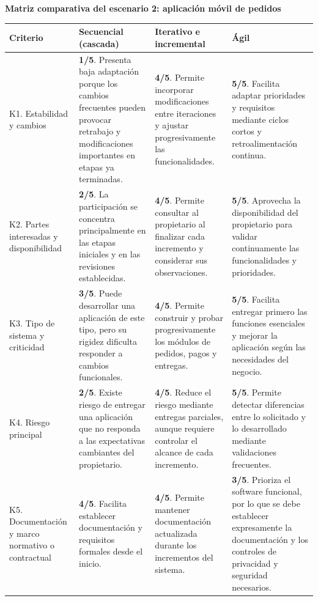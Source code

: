 \documentclass[11pt,a4paper]{article}
\begin{document}
	\noindent\begin{minipage}{\textwidth}
	\begin{center}
		\textbf{Matriz comparativa del escenario 2: aplicación móvil de pedidos}
	\end{center}
	
	\begin{tabularx}{\textwidth}{|p{2.6cm}|Y|Y|Y|}
		\hline
		\textbf{Criterio} &
		\textbf{Secuencial (cascada)} &
		\textbf{Iterativo e incremental} &
		\textbf{Ágil} \\ \hline
		
		K1. Estabilidad y cambios &
		\textbf{1/5}. Presenta baja adaptación porque los cambios frecuentes pueden provocar retrabajo y modificaciones importantes en etapas ya terminadas. &
		\textbf{4/5}. Permite incorporar modificaciones entre iteraciones y ajustar progresivamente las funcionalidades. &
		\textbf{5/5}. Facilita adaptar prioridades y requisitos mediante ciclos cortos y retroalimentación continua. \\ \hline
		
		K2. Partes interesadas y disponibilidad &
		\textbf{2/5}. La participación se concentra principalmente en las etapas iniciales y en las revisiones establecidas. &
		\textbf{4/5}. Permite consultar al propietario al finalizar cada incremento y considerar sus observaciones. &
		\textbf{5/5}. Aprovecha la disponibilidad del propietario para validar continuamente las funcionalidades y prioridades. \\ \hline
		
		K3. Tipo de sistema y criticidad &
		\textbf{3/5}. Puede desarrollar una aplicación de este tipo, pero su rigidez dificulta responder a cambios funcionales. &
		\textbf{4/5}. Permite construir y probar progresivamente los módulos de pedidos, pagos y entregas. &
		\textbf{5/5}. Facilita entregar primero las funciones esenciales y mejorar la aplicación según las necesidades del negocio. \\ \hline
		
		K4. Riesgo principal &
		\textbf{2/5}. Existe riesgo de entregar una aplicación que no responda a las expectativas cambiantes del propietario. &
		\textbf{4/5}. Reduce el riesgo mediante entregas parciales, aunque requiere controlar el alcance de cada incremento. &
		\textbf{5/5}. Permite detectar diferencias entre lo solicitado y lo desarrollado mediante validaciones frecuentes. \\ \hline
		
		K5. Documentación y marco normativo o contractual &
		\textbf{4/5}. Facilita establecer documentación y requisitos formales desde el inicio. &
		\textbf{4/5}. Permite mantener documentación actualizada durante los incrementos del sistema. &
		\textbf{3/5}. Prioriza el software funcional, por lo que se debe establecer expresamente la documentación y los controles de privacidad y seguridad necesarios. \\ \hline
	\end{tabularx}
	\end{minipage}\par
	
\end{document}
